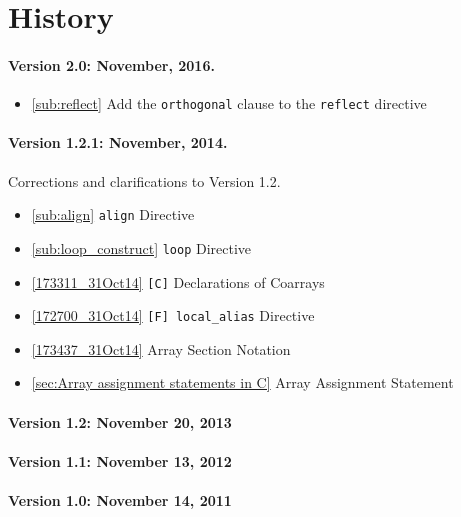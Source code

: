 \section*{History}

\paragraph*{Version 2.0: November, 2016.}

\begin{itemize}
  \item \ref{sub:reflect} Add the {\tt orthogonal} clause to the {\tt reflect} directive
\end{itemize}


\paragraph*{Version 1.2.1: November, 2014.} Corrections and
clarifications to Version 1.2.

\begin{itemize}
  \item \ref{sub:align} {\tt align} Directive
  \item \ref{sub:loop_construct} {\tt loop} Directive
  \item \ref{173311_31Oct14} {\tt [C]} Declarations of Coarrays
  \item \ref{172700_31Oct14} {\tt [F] local\_alias} Directive
  \item \ref{173437_31Oct14} Array Section Notation
  \item \ref{sec:Array assignment statements in C} Array Assignment Statement
\end{itemize}

\paragraph*{Version 1.2: November 20, 2013}

\paragraph*{Version 1.1: November 13, 2012}

\paragraph*{Version 1.0: November 14, 2011}
